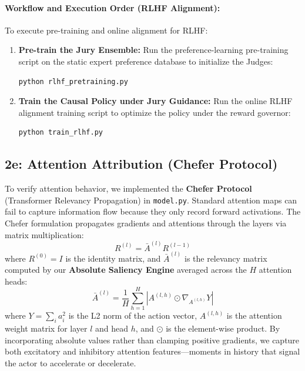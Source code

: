 \documentclass[11pt,a4paper]{article}
\begin{document}
\paragraph{Workflow and Execution Order (RLHF Alignment):}
To execute pre-training and online alignment for RLHF:
\begin{enumerate}
    \item \textbf{Pre-train the Jury Ensemble:} Run the preference-learning pre-training script on the static expert preference database to initialize the Judges:
    \begin{lstlisting}[language=bash]
    python rlhf_pretraining.py
    \end{lstlisting}
    \item \textbf{Train the Causal Policy under Jury Guidance:} Run the online RLHF alignment training script to optimize the policy under the reward governor:
    \begin{lstlisting}[language=bash]
    python train_rlhf.py
    \end{lstlisting}
\end{enumerate}

\FloatBarrier
\subsection{2e: Attention Attribution (Chefer Protocol)}
To verify attention behavior, we implemented the \textbf{Chefer Protocol} (Transformer Relevancy Propagation) in \texttt{model.py}. Standard attention maps can fail to capture information flow because they only record forward activations. The Chefer formulation propagates gradients and attentions through the layers via matrix multiplication:
\begin{equation}
R^{(l)} = \bar{A}^{(l)} R^{(l-1)}
\end{equation}
where $R^{(0)} = I$ is the identity matrix, and $\bar{A}^{(l)}$ is the relevancy matrix computed by our \textbf{Absolute Saliency Engine} averaged across the $H$ attention heads:
\begin{equation}
\bar{A}^{(l)} = \frac{1}{H} \sum_{h=1}^H \left| A^{(l, h)} \odot \nabla_{A^{(l, h)}} Y \right|
\end{equation}
where $Y = \sum_i a_i^2$ is the L2 norm of the action vector, $A^{(l, h)}$ is the attention weight matrix for layer $l$ and head $h$, and $\odot$ is the element-wise product. By incorporating absolute values rather than clamping positive gradients, we capture both excitatory and inhibitory attention features—moments in history that signal the actor to accelerate or decelerate.
\end{document}
